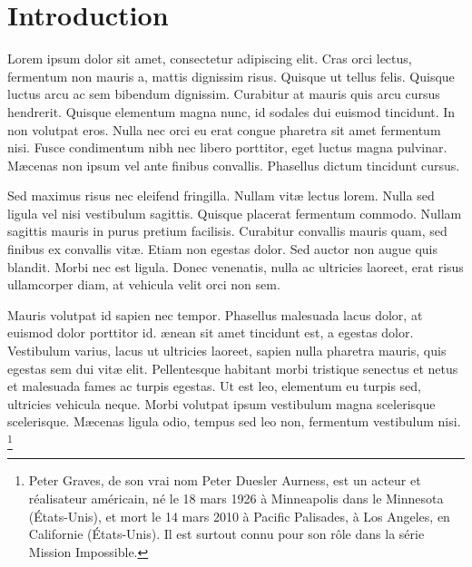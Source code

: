 \documentclass[11pt]{article}
\begin{document}
%
%
\pagestyle{empty} 
%
%
\setlength{\baselineskip}{12.6pt} %
\setlength{\normalbaselineskip}{12.6pt} %

%
%

\section{Introduction\label{sec:intro}}

Lorem ipsum dolor sit amet, consectetur adipiscing elit. Cras orci lectus, fermentum non mauris a, mattis dignissim risus. Quisque ut tellus felis. Quisque luctus arcu ac sem bibendum dignissim. Curabitur at mauris quis arcu cursus hendrerit. Quisque elementum magna nunc, id sodales dui euismod tincidunt. In non volutpat eros. Nulla nec orci eu erat congue pharetra sit amet fermentum nisi. Fusce condimentum nibh nec libero porttitor, eget luctus magna pulvinar. M{\ae}cenas non ipsum vel ante finibus convallis. Phasellus dictum tincidunt cursus.

Sed maximus risus nec eleifend fringilla. Nullam vit{\ae} lectus lorem. Nulla sed ligula vel nisi vestibulum sagittis. Quisque placerat fermentum commodo. Nullam sagittis mauris in purus pretium facilisis. Curabitur convallis mauris quam, sed finibus ex convallis vit{\ae}. Etiam non egestas dolor. Sed auctor non augue quis blandit. Morbi nec est ligula. Donec venenatis, nulla ac ultricies laoreet, erat risus ullamcorper diam, at vehicula velit orci non sem. 

Mauris volutpat id sapien nec tempor. Phasellus malesuada lacus dolor, at euismod dolor porttitor id. {\ae}nean sit amet tincidunt est, a egestas dolor. Vestibulum varius, lacus ut ultricies laoreet, sapien nulla pharetra mauris, quis egestas sem dui vit{\ae} elit. Pellentesque habitant morbi tristique senectus et netus et malesuada fames ac turpis egestas. Ut est leo, elementum eu turpis sed, ultricies vehicula neque. Morbi volutpat ipsum vestibulum magna scelerisque scelerisque. M{\ae}cenas ligula odio, tempus sed leo non, fermentum vestibulum nisi.%
\footnote{Peter Graves, de son vrai nom Peter Duesler Aurness, est un acteur et
    r\'{e}alisateur am\'{e}ricain, n\'{e} le 18 mars 1926 \`{a} Minneapolis dans le Minnesota (\'{E}tats-Unis), et mort le 14 mars 2010 \`{a} Pacific Palisades, à Los Angeles, en Californie (\'{E}tats-Unis). Il est surtout connu pour son r\^{o}le dans la s\'{e}rie Mission Impossible. }
\end{document}
